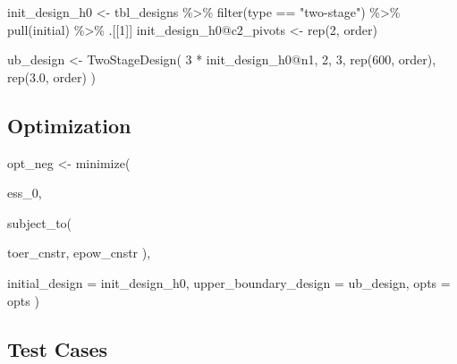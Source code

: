 \documentclass[
]{book}
\newenvironment{Shaded}{\begin{snugshade}}{\end{snugshade}}
\newcommand{\AttributeTok}[1]{\textcolor[rgb]{0.77,0.63,0.00}{#1}}
\newcommand{\DecValTok}[1]{\textcolor[rgb]{0.00,0.00,0.81}{#1}}
\newcommand{\FloatTok}[1]{\textcolor[rgb]{0.00,0.00,0.81}{#1}}
\newcommand{\FunctionTok}[1]{\textcolor[rgb]{0.00,0.00,0.00}{#1}}
\newcommand{\NormalTok}[1]{#1}
\newcommand{\OtherTok}[1]{\textcolor[rgb]{0.56,0.35,0.01}{#1}}
\newcommand{\SpecialCharTok}[1]{\textcolor[rgb]{0.00,0.00,0.00}{#1}}
\newcommand{\StringTok}[1]{\textcolor[rgb]{0.31,0.60,0.02}{#1}}
\begin{document}
\begin{Shaded}
\begin{Highlighting}[]
\NormalTok{init\_design\_h0 }\OtherTok{\textless{}{-}}\NormalTok{ tbl\_designs }\SpecialCharTok{\%\textgreater{}\%} 
    \FunctionTok{filter}\NormalTok{(type }\SpecialCharTok{==} \StringTok{"two{-}stage"}\NormalTok{) }\SpecialCharTok{\%\textgreater{}\%} 
    \FunctionTok{pull}\NormalTok{(initial) }\SpecialCharTok{\%\textgreater{}\%} 
\NormalTok{    .[[}\DecValTok{1}\NormalTok{]]}
\NormalTok{init\_design\_h0}\SpecialCharTok{@}\NormalTok{c2\_pivots }\OtherTok{\textless{}{-}} \FunctionTok{rep}\NormalTok{(}\DecValTok{2}\NormalTok{, order)}

\NormalTok{ub\_design }\OtherTok{\textless{}{-}} \FunctionTok{TwoStageDesign}\NormalTok{(}
    \DecValTok{3} \SpecialCharTok{*}\NormalTok{ init\_design\_h0}\SpecialCharTok{@}\NormalTok{n1,}
    \DecValTok{2}\NormalTok{,}
    \DecValTok{3}\NormalTok{,}
    \FunctionTok{rep}\NormalTok{(}\DecValTok{600}\NormalTok{, order),}
    \FunctionTok{rep}\NormalTok{(}\FloatTok{3.0}\NormalTok{, order)}
\NormalTok{)}
\end{Highlighting}
\end{Shaded}

\hypertarget{optimization-4}{%
\subsection{Optimization}\label{optimization-4}}

\begin{Shaded}
\begin{Highlighting}[]
\NormalTok{opt\_neg }\OtherTok{\textless{}{-}} \FunctionTok{minimize}\NormalTok{(}
  
\NormalTok{        ess\_0,}
        
        \FunctionTok{subject\_to}\NormalTok{(}
          
\NormalTok{            toer\_cnstr,}
\NormalTok{            epow\_cnstr}
\NormalTok{        ),}
        
        \AttributeTok{initial\_design =}\NormalTok{ init\_design\_h0,}
        \AttributeTok{upper\_boundary\_design =}\NormalTok{ ub\_design,}
        \AttributeTok{opts =}\NormalTok{ opts}
\NormalTok{)}
\end{Highlighting}
\end{Shaded}

\hypertarget{test-cases-4}{%
\subsection{Test Cases}\label{test-cases-4}}
\end{document}
